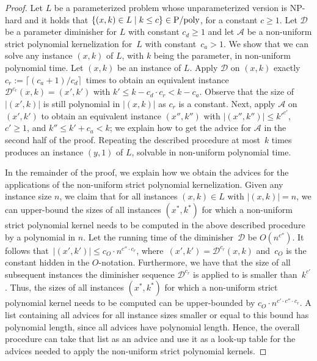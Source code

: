 \documentclass[11pt,a4,USenglish]{article}
\newcommand{\NP}{\textnormal{NP}}
\newcommand{\PTIME}{\textnormal{P}}
\theoremstyle{definition}
\theoremstyle{plain}
\theoremstyle{remark}
\newcommand{\calD}{\mathcal{D}}
\newcommand{\calA}{\mathcal{A}}
\begin{document}
\begin{proof}
 Let $L$ be a parameterized problem whose unparameterized version is \NP{}-hard and it holds that $\{(x,k)\in L\mid k\le c\}\in \PTIME{}/\textnormal{poly}$, for a constant $c\geq 1$. 
%
 Let $\calD$ be a parameter diminisher for $L$ with constant $c_d\geq 1$ and let $\calA$ be a non-uniform strict polynomial kernelization for~$L$ with constant~$c_a>1$. 
 \iflong{}We show that we can solve any instance $(x,k)$ of $L$, with $k$ being the parameter, in non-uniform polynomial time. \fi{}%
 Let $(x,k)$ be an instance of $L$.
 Apply $\calD$ on $(x,k)$ exactly $c_r:=\lceil (c_a+1)/c_d\rceil$~times to obtain an equivalent instance $\calD^{c_r}(x,k)=(x',k')$ with $k'\leq k-c_d \cdot c_r< k-c_a$.
 Observe that the size of~$|(x', k)|$ is still polynomial in $|(x, k)|$ as $c_r$ is a constant.
 Next, apply $\calA$ on $(x',k')$ to obtain an equivalent instance $(x'',k'')$ with $|(x'', k'')|\leq k'^{c'}$, $c'\geq 1$, and $k''\leq k' + c_a <k$; we explain how to get the advice for $\calA$ in the second half of the proof.
 Repeating the described procedure at most~$k$ times produces an instance $(y,1)$ of $L$, solvable in non-uniform polynomial time. 
 
In the remainder of the proof, we explain how we obtain the advices for the applications of the non-uniform strict polynomial kernelization. 
Given any instance size $n$, we claim that for all instances $(x, k) \in L$ with $|(x, k)| = n$, we can upper-bound the sizes of all instances $(x^*, k^*)$ for which a non-uniform strict polynomial kernel needs to be computed in the above described procedure by a polynomial in $n$. 
Let the running time of the diminisher~$\calD$ be $O(n^{c''})$.
It follows that~$|(x',k')| \le c_O\cdot n^{c''\cdot c_r}$, where~$(x',k')=\calD^{c_r}(x,k)$ and~$c_O$ is the constant hidden in the $O$-notation. 
Furthermore, we have that the size of all subsequent instances the diminisher sequence $\calD^{c_r}$ is applied to is smaller than~$k^{c'}$. 
Thus, the sizes of all instances $(x^*, k^*)$ for which a non-uniform strict polynomial kernel needs to be computed can be upper-bounded by $c_O\cdot n^{c' \cdot c''\cdot c_r}$. 
A list containing all advices for all instance sizes smaller or equal to this bound has polynomial length, since all advices have polynomial length. 
Hence, the overall procedure can take that list as an advice and use it as a look-up table for the advices needed to apply the non-uniform strict polynomial kernels.
\end{proof}
\end{document}
